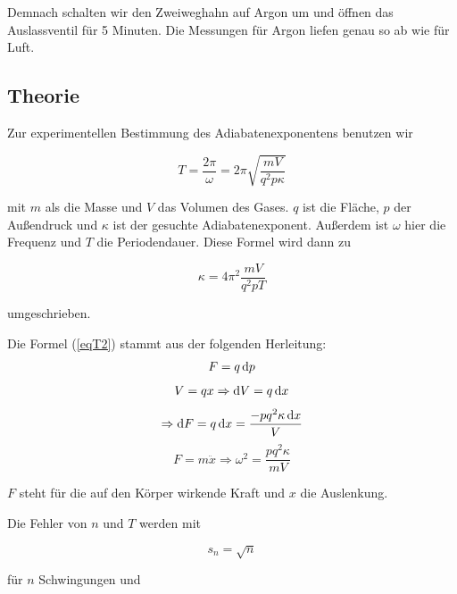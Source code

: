 \documentclass[11pt,a4paper]{article}
\newcommand\dif{\mathop{}\!\mathrm{d}}
\begin{document}
Demnach schalten wir den Zweiweghahn auf Argon um und öffnen das Auslassventil für 5 Minuten. Die Messungen für Argon liefen genau so ab wie für Luft. 

\subsection{Theorie}

Zur experimentellen Bestimmung des Adiabatenexponentens benutzen wir

\begin{equation}
T=\frac{2\pi}{\omega}=2\pi\sqrt{\frac{mV}{q^2p\kappa}}\label{eqT1}
\end{equation}

mit $m$ als die Masse und $V$ das Volumen des Gases. $q$ ist die Fl\"ache, $p$ der Au\ss endruck und $\kappa$ ist der gesuchte Adiabatenexponent. Au\ss erdem ist $\omega$ hier die Frequenz und $T$ die Periodendauer. Diese Formel wird dann zu

\begin{equation}
\kappa=4\pi^2\frac{mV}{q^2pT}\label{eqT2}
\end{equation}

umgeschrieben.

Die Formel (\ref{eqT2}) stammt aus der folgenden Herleitung:
$$F=q\dif p\\
$$
$$V=qx\Rightarrow \dif V=q\dif x\\
$$
$$\Rightarrow \dif F=q\dif x=\frac{-pq^2\kappa\dif x}{V}\\
$$
$$F=m\ddot{x}\Rightarrow \omega^2=\frac{pq^2\kappa}{mV}
$$

$F$ steht f\"ur die auf den K\"orper wirkende Kraft und $x$ die Auslenkung.

Die Fehler von $n$ und $T$ werden mit

\begin{equation}
s_n=\sqrt{n}\label{equn}
\end{equation}

f\"ur $n$ Schwingungen und
\end{document}
